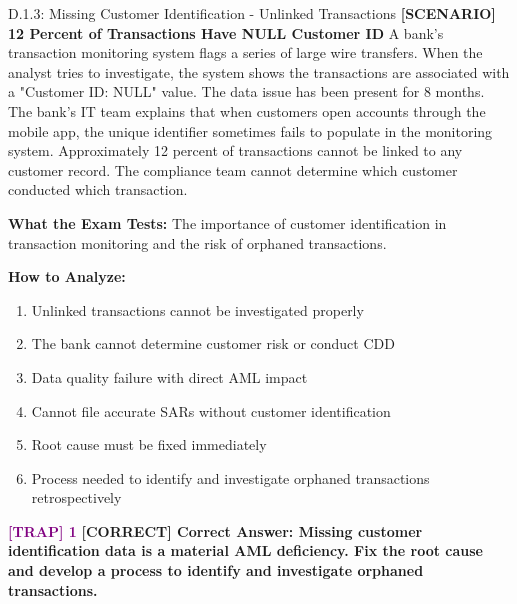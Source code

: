 \documentclass[11pt,a4paper]{beamer}
\newcommand{\trap}[1]{\textcolor{purple}{\textbf{[TRAP] 1}}}
\newcommand{\correct}[1]{\textcolor{green!50!black}{\textbf{[CORRECT] #1}}}
\newcommand{\scenario}[1]{\textcolor{blue!70!black}{\textbf{[SCENARIO] #1}}}
\begin{document}
\begin{frame}{D.1.3: Missing Customer Identification - Unlinked Transactions}
	\scenario{12 Percent of Transactions Have NULL Customer ID}
	A bank's transaction monitoring system flags a series of large wire transfers. When the analyst tries to investigate, the system shows the transactions are associated with a "Customer ID: NULL" value. The data issue has been present for 8 months. The bank's IT team explains that when customers open accounts through the mobile app, the unique identifier sometimes fails to populate in the monitoring system. Approximately 12 percent of transactions cannot be linked to any customer record. The compliance team cannot determine which customer conducted which transaction.
	
	\vspace{0.1cm}
	\textbf{What the Exam Tests:} The importance of customer identification in transaction monitoring and the risk of orphaned transactions.
	
	\vspace{0.1cm}
	\textbf{How to Analyze:}
	\begin{enumerate}
		\item Unlinked transactions cannot be investigated properly
		\item The bank cannot determine customer risk or conduct CDD
		\item Data quality failure with direct AML impact
		\item Cannot file accurate SARs without customer identification
		\item Root cause must be fixed immediately
		\item Process needed to identify and investigate orphaned transactions retrospectively
	\end{enumerate}
	
	\trap{Common Distractor: "IT issues are operational and not a compliance concern."}
	\correct{Correct Answer: Missing customer identification data is a material AML deficiency. Fix the root cause and develop a process to identify and investigate orphaned transactions.}
\end{frame}
\end{document}
